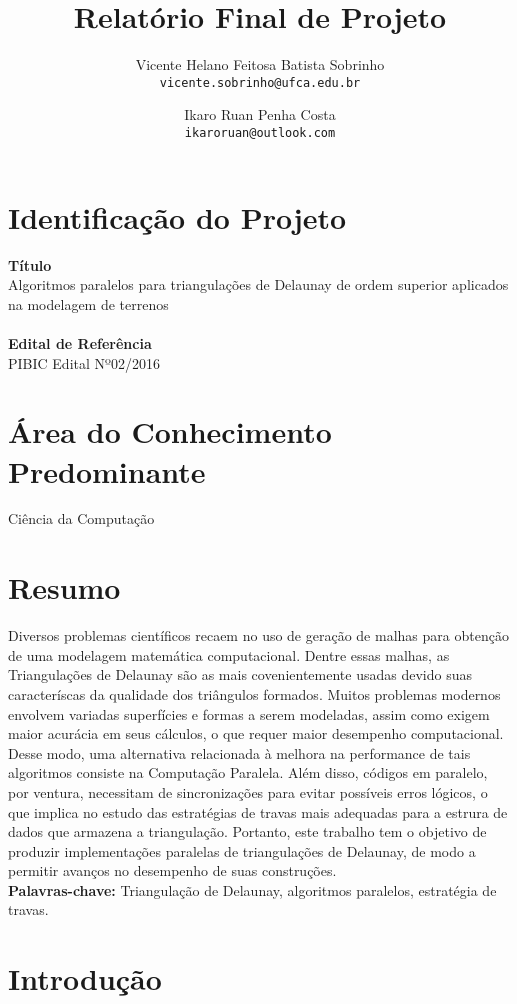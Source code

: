 \documentclass[a4paper, 12pt]{article}
\title{ Relatório Final de Projeto
	}
\date{}
\author{ Vicente Helano Feitosa Batista Sobrinho \\
	\texttt{vicente.sobrinho@ufca.edu.br}
	\and
	Ikaro Ruan Penha Costa \\
	\texttt{ikaroruan@outlook.com}
	}
\begin{document}
\maketitle

\section*{Identificação do Projeto}
\textbf{Título} \\
Algoritmos paralelos para triangulações de Delaunay de ordem superior aplicados na modelagem de terrenos \\ \\
\textbf{Edital de Referência} \\
PIBIC Edital Nº02/2016

\section*{Área do Conhecimento Predominante}
Ciência da Computação

\section*{Resumo}
Diversos problemas científicos recaem no uso de geração de malhas para obtenção de uma modelagem matemática computacional. Dentre 
essas malhas, as Triangulações de Delaunay são as mais covenientemente usadas devido suas caracteríscas da qualidade 
dos triângulos formados. Muitos problemas modernos envolvem variadas superfícies e formas a serem modeladas, assim 
como exigem maior acurácia em seus cálculos, o que requer maior desempenho computacional. Desse modo, uma alternativa 
relacionada à melhora na performance de tais algoritmos consiste na Computação Paralela. Além disso, códigos 
em paralelo, por ventura, necessitam de sincronizações para evitar possíveis erros lógicos, o que implica no estudo
das estratégias de travas mais adequadas para a estrura de dados que armazena a triangulação. Portanto, 
este trabalho tem o objetivo de produzir implementações paralelas de triangulações de Delaunay, de modo a permitir 
avanços no desempenho de suas construções. \\

\textbf{Palavras-chave:} Triangulação de Delaunay, algoritmos paralelos, estratégia de travas. \\

\section*{Introdução}
\end{document}

